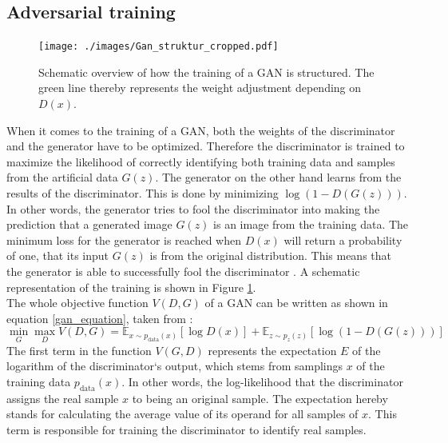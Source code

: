 \subsection{Adversarial training}\label{adversariallearning}
\begin{figure}[b]
    \begin{center}
     \texttt{[image: ./images/Gan\_struktur\_cropped.pdf]}
    \caption[GAN structure.]{{Schematic overview of how the training of a GAN is structured. The green line thereby represents the weight adjustment depending on $D(x)$.}\label{gan_schematic_fig}}
    \end{center}
\end{figure}
When it comes to the training of a GAN, both the weights of the discriminator and the generator have to be optimized.
Therefore the discriminator is trained to maximize the likelihood of correctly identifying both training data and samples from the artificial data $G(z)$.
The generator on the other hand learns from the results of the discriminator. 
This is done by minimizing $\log(1 - D(G(z)))$. 
In other words, the generator tries to fool the discriminator into making the prediction that a generated image $G(z)$ is an image from the training data.
The minimum loss for the generator is reached when $D(x)$ will return a probability of one, that its input $G(z)$ is from the original distribution.
This means that the generator is able to successfully fool the discriminator \cite{Goodfellow2014}.
A schematic representation of the training is shown in Figure \ref{gan_schematic_fig}.\\
The whole objective function $V(D,G)$ of a GAN can be written as shown in equation \ref{gan_equation}, taken from \cite{Goodfellow2014}:
\begin{equation}
    \min_{G}\max_{D}V(D,G) = \mathbb{E}_{x\sim p_{\text{data}}(x)}[\log D(x)]+\mathbb{E}_{z\sim p_z(z)}[\log(1-D(G(z)))]
    \label{gan_equation}
\end{equation}
The first term in the function $V(G,D)$ represents the expectation $E$ of the logarithm of the discriminator`s output, which stems from samplings $x$ of the training data $p_{\text{data}}(x)$.
In other words, the log-likelihood that the discriminator assigns the real sample $x$ to being an original sample.
The expectation hereby stands for calculating the average value of its operand for all samples of $x$.
This term is responsible for training the discriminator to identify real samples.
